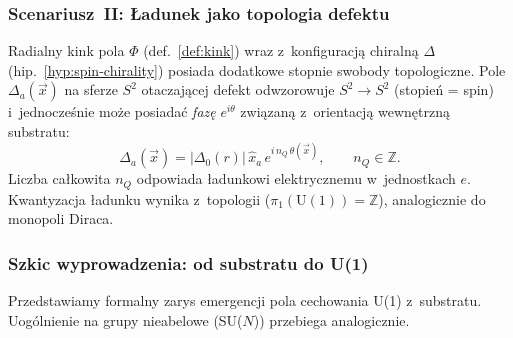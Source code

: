 \subsubsection{Scenariusz~II: \L{}adunek jako topologia defektu}

\begin{hypothesis}%
\label{hyp:charge-topology}
Radialny kink pola $\Phi$ (def.~\ref{def:kink}) wraz
z~konfiguracj\k{a} chiraln\k{a} $\Delta$ (hip.~\ref{hyp:spin-chirality})
posiada dodatkowe stopnie swobody topologiczne.
Pole $\Delta_a(\vec{x})$ na sferze $S^2$ otaczaj\k{a}cej
defekt odwzorowuje $S^2 \to S^2$ (stopie\'n = spin)
i~jednocze\'snie mo\.ze posiada\'c \emph{faz\k{e}} $e^{i\theta}$
zwi\k{a}zan\k{a} z~orientacj\k{a} wewn\k{e}trzn\k{a} substratu:
\begin{equation}\label{eq:charge-phase}
  \Delta_a(\vec{x}) = |\Delta_0(r)|\,\hat{x}_a\,
  e^{i\,n_Q\,\theta(\vec{x})},
  \qquad n_Q \in \mathbb{Z}.
\end{equation}
Liczba ca\l{}kowita $n_Q$ odpowiada \l{}adunkowi
elektrycznemu w~jednostkach $e$. Kwantyzacja
\l{}adunku wynika z~topologii ($\pi_1(\mathrm{U}(1)) = \mathbb{Z}$),
analogicznie do monopoli Diraca.
\end{hypothesis}

\subsubsection{Szkic wyprowadzenia: od substratu do U(1)}

Przedstawiamy formalny zarys emergencji pola cechowania U(1)
z~substratu. Uog\'olnienie na grupy nieabelowe (SU($N$))
przebiega analogicznie.


